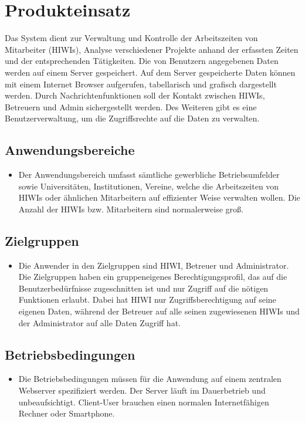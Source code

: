 \section{Produkteinsatz}
Das System dient zur Verwaltung und Kontrolle der Arbeitszeiten von Mitarbeiter (HIWIs), Analyse verschiedener Projekte anhand der erfassten Zeiten und der entsprechenden Tätigkeiten. Die von Benutzern angegebenen Daten werden auf einem Server gespeichert. Auf dem Server gespeicherte Daten können mit einem Internet Browser aufgerufen, tabellarisch und grafisch dargestellt werden. Durch Nachrichtenfunktionen soll der Kontakt zwischen HIWIs, Betreuern und Admin sichergestellt werden. Des Weiteren gibt es eine Benutzerverwaltung, um die Zugriffsrechte auf die Daten zu verwalten.
\subsection{Anwendungsbereiche}
\begin{itemize}
	\item Der Anwendungsbereich umfasst sämtliche gewerbliche Betriebsumfelder sowie Universitäten, Institutionen, Vereine, welche die Arbeitszeiten von HIWIs oder ähnlichen Mitarbeitern auf effizienter Weise verwalten wollen. Die Anzahl der HIWIs bzw. Mitarbeitern sind normalerweise groß. 
\end{itemize}

\subsection{Zielgruppen}
\begin{itemize}
	\item Die Anwender in den Zielgruppen sind HIWI, Betreuer und Administrator. Die Zielgruppen haben ein gruppeneigenes Berechtigungsprofil, das auf die Benutzerbedürfnisse zugeschnitten ist und nur Zugriff auf die nötigen Funktionen erlaubt. Dabei hat HIWI nur Zugriffsberechtigung auf seine eigenen Daten, während der Betreuer auf alle seinen zugewiesenen HIWIs und der Administrator auf alle Daten Zugriff hat.
\end{itemize}

\subsection{Betriebsbedingungen}
\begin{itemize}
	\item Die Betriebsbedingungen müssen für die Anwendung auf einem zentralen Webserver spezifiziert werden. Der Server läuft im Dauerbetrieb und unbeaufsichtigt. Client-User brauchen einen normalen Internetfähigen Rechner oder Smartphone.
\end{itemize}
